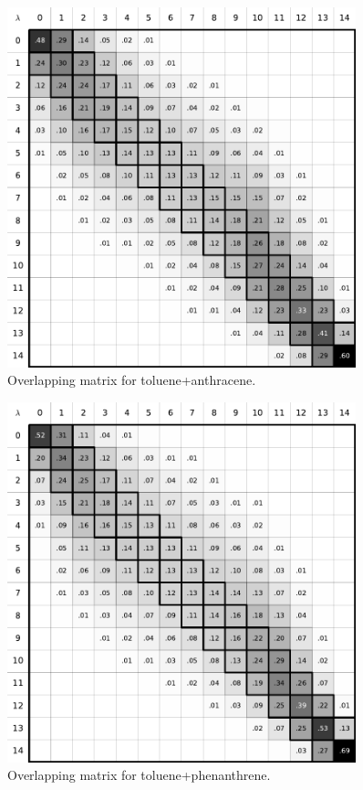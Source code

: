 \documentclass[
	12pt,				%
	openany,			%
	oneside,			%
	a4paper,			%
	english,			%
	brazil				%
	]{abntex2}
\begin{document}
\begin{apendicesenv}
\begin{figure}[H]
	\centering
	\includegraphics[width=0.9\textwidth]{Figures/otol_antr}
	\caption{Overlapping matrix for toluene+anthracene.}
\end{figure}

\begin{figure}[H]
	\centering
	\includegraphics[width=0.9\textwidth]{Figures/otol_phen}
	\caption{Overlapping matrix for toluene+phenanthrene.}
\end{figure}


\end{apendicesenv}
\end{document}
